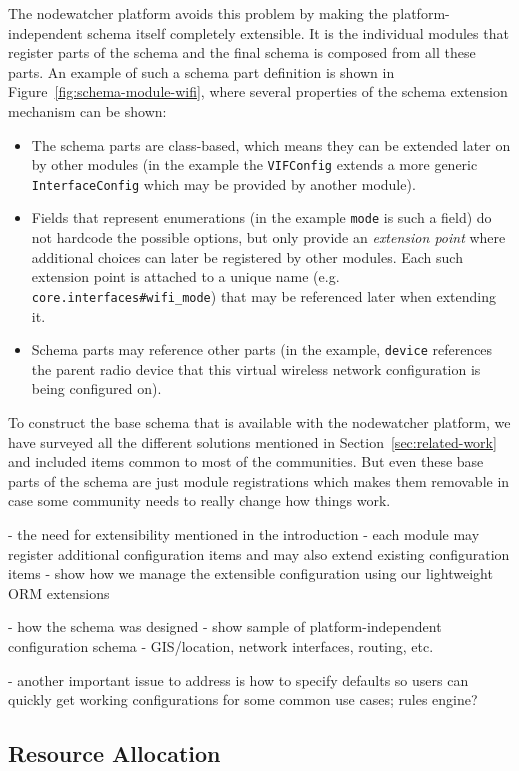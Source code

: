 \documentclass[5p,sort&compress]{elsarticle}
\begin{document}
The nodewatcher platform avoids this problem by making the platform-independent schema itself completely extensible. It is the individual modules that register parts of the schema and the final schema is composed from all these parts. An example of such a schema part definition is shown in Figure~\ref{fig:schema-module-wifi}, where several properties of the schema extension mechanism can be shown:
\begin{itemize}
    \item The schema parts are class-based, which means they can be extended later on by other modules (in the example the \texttt{VIFConfig} extends a more generic \texttt{InterfaceConfig} which may be provided by another module).
    \item Fields that represent enumerations (in the example \texttt{mode} is such a field) do not hardcode the possible options, but only provide an \textit{extension point} where additional choices can later be registered by other modules. Each such extension point is attached to a unique name (e.g. \texttt{core.interfaces\#wifi\_mode}) that may be referenced later when extending it.
    \item Schema parts may reference other parts (in the example, \texttt{device} references the parent radio device that this virtual wireless network configuration is being configured on).
\end{itemize}

To construct the base schema that is available with the nodewatcher platform, we have surveyed all the different solutions mentioned in Section~\ref{sec:related-work} and included items common to most of the communities. But even these base parts of the schema are just module registrations which makes them removable in case some community needs to really change how things work.


- the need for extensibility mentioned in the introduction
    - each module may register additional configuration items and may also extend existing configuration items
    - show how we manage the extensible configuration using our lightweight ORM extensions

- how the schema was designed
- show sample of platform-independent configuration schema
  - GIS/location, network interfaces, routing, etc.

- another important issue to address is how to specify defaults so users can quickly get working configurations for some common use cases; rules engine?

\subsection{Resource Allocation}
\end{document}
